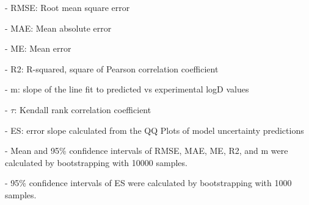\documentclass{article}
\begin{document}
- RMSE: Root mean square error

- MAE: Mean absolute error

- ME: Mean error

- R2: R-squared, square of Pearson correlation coefficient

- m: slope of the line fit to predicted vs experimental logD values

- $\tau$:  Kendall rank correlation coefficient

- ES: error slope calculated from the QQ Plots of model uncertainty predictions

- Mean and 95\% confidence intervals of RMSE, MAE, ME, R2, and m were calculated by bootstrapping with 10000 samples.

- 95\% confidence intervals of ES were calculated by bootstrapping with 1000 samples.\end{document}
\end{document}
